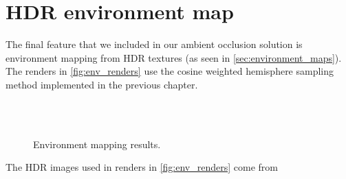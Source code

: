\section{HDR environment map}
The final feature that we included in our ambient occlusion solution is environment mapping from HDR textures (as seen in \autoref{sec:environment_maps}). The renders in \autoref{fig:env_renders} use the cosine weighted hemisphere sampling method implemented in the previous chapter. 
\begin{figure}[h!]
	\centering
    	\\
    	\\
	\caption{Environment mapping results.}
	\label{fig:env_renders}
\end{figure}
The HDR images used in renders in \autoref{fig:env_renders} come from \cite{website:PaulDebevec}
